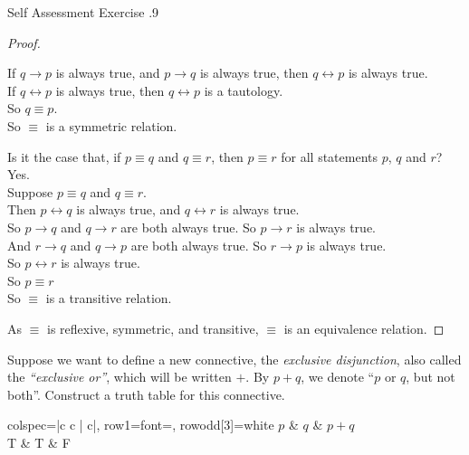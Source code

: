 \documentclass[\main/notes.tex]{subfiles}
\begin{document}
\begin{exercise}{Self Assessment Exercise \thechapter.9}
\begin{questions}
\begin{answer}
\begin{proof}
\begin{questions}[label=(\roman*)]
\begin{subproof}[Symmetry]
											If $q \rightarrow p$ is always true, and $p \rightarrow q$ is always true, then $q \leftrightarrow p$ is always true.\\
											If $q \leftrightarrow p$ is always true, then $q \leftrightarrow p$ is a tautology.\\
											So $q \equiv p$.\\
											So $\equiv$ is a symmetric relation.
										\end{subproof}
									\item
										\begin{subproof}[Transitivity]
											Is it the case that, if $p \equiv q$ and $q \equiv r$, then $p \equiv r$ for all statements $p$, $q$ and $r$? Yes.\\
											Suppose $p \equiv q$ and $q \equiv r$.\\
											Then $p \leftrightarrow q$ is always true, and $q \leftrightarrow r$ is always true.\\
											So $p \rightarrow q$ and $q \rightarrow r$ are both always true. So $p \rightarrow r$ is always true.\\
											And $r \rightarrow q$ and $q \rightarrow p$ are both always true. So $r \rightarrow p$ is always true.\\
											So $p \leftrightarrow r$ is always true.\\
											So $p \equiv r$\\
											So $\equiv$ is a transitive relation.
										\end{subproof}
								\end{questions}
								As $\equiv$ is reflexive, symmetric, and transitive, $\equiv$ is an equivalence relation.
							\end{proof}
						\end{answer}
					\item Suppose we want to define a new connective, the \emph{exclusive disjunction}, also called the \emph{``exclusive or''}, which will be written $+$. By $p + q$, we denote ``$p$ or $q$, but not both''. Construct a truth table for this connective.
						\begin{answer}
							\begin{center}
								\begin{tblr}{colspec={|c c | c|}, row{1}={font=\bfseries}, row{odd[3]}={white}}
									\toprule
									$p$ & $q$ & $p + q$\\
									\midrule
									T & T & F\\

\end{tblr}
\end{center}
\end{answer}
\end{questions}
\end{exercise}
\end{document}
